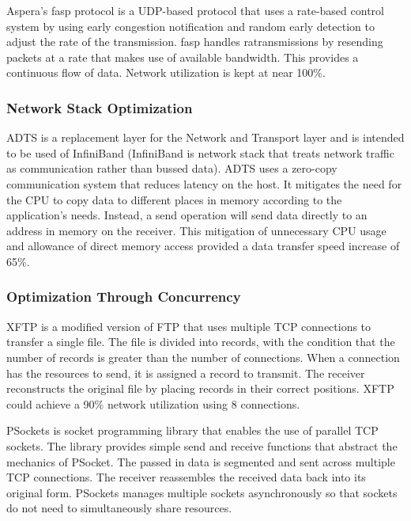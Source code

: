 Aspera's fasp protocol \cite{Aspera2016}\cite{Fan2010} is a UDP-based protocol that uses a rate-based control system by using early congestion notification and random early detection to adjust the rate of the transmission. fasp handles ratransmissions by resending packets at a rate that makes use of available bandwidth. This provides a continuous flow of data. Network utilization is kept at near 100\%.

\subsubsection{Network Stack Optimization}

ADTS \cite{lai2009designing} is a replacement layer for the Network and Transport layer and is intended to be used of InfiniBand \cite{Pfister2001} (InfiniBand is network stack that treats network traffic as communication rather than bussed data). ADTS uses a zero-copy communication system that reduces latency on the host. It mitigates the need for the CPU to copy data to different places in memory according to the application's needs. Instead, a send operation will send data directly to an address in memory on the receiver. This mitigation of unnecessary CPU usage and allowance of direct memory access provided a data transfer speed increase of 65\%.

\subsubsection{Optimization Through Concurrency}

XFTP \cite{Allman1995}\cite{Allman1997} is a modified version of FTP \cite{postel1980user} that uses multiple TCP connections to transfer a single file. The file is divided into records, with the condition that the number of records is greater than the number of connections. When a connection has the resources to send, it is assigned a record to transmit. The receiver reconstructs the original file by placing records in their correct positions. XFTP could achieve a 90\% network utilization using 8 connections.

PSockets \cite{Sivakumar2000psockets} is socket programming library that enables the use of parallel TCP sockets. The library provides simple send and receive functions that abstract the mechanics of PSocket. The passed in data is segmented and sent across multiple TCP connections. The receiver reassembles the received data back into its original form. PSockets manages multiple sockets asynchronously so that sockets do not need to simultaneously share resources. 


